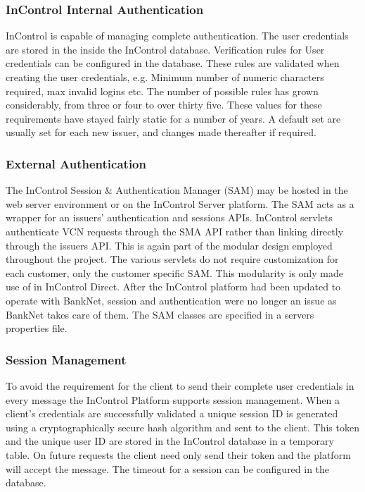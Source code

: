 \documentclass[a4paper, 11pt, titlepage]{article}
\begin{document}
\subsubsection{InControl Internal Authentication} 
InControl is capable of managing complete authentication. The user credentials are stored in the inside the InControl database.
Verification rules for User credentials can be configured in the database. These rules are validated when creating the user credentials, e.g. Minimum number of numeric characters required, max invalid logins etc. The number of possible rules has grown considerably, from three or four to over thirty five. These values for these requirements have stayed fairly static for a number of years. A default set are usually set for each new issuer, and changes made thereafter if required.  
 
\subsubsection{External Authentication} 
The InControl Session \& Authentication Manager (SAM) may be hosted in the web server environment or on the InControl Server platform. The SAM acts as a wrapper for an issuers' authentication and sessions APIs. InControl servlets authenticate VCN requests through the SMA API rather than linking directly through the issuers API. This is again part of the modular design employed throughout the project. The various servlets do not require customization for each customer, only the customer specific SAM. This modularity is only made use of in InControl Direct. After the InControl platform had been updated to operate with BankNet, session and authentication were no longer an issue as BankNet takes care of them. 
The SAM classes are specified in a servers properties file. 
 
\subsubsection{Session Management} 
To avoid the requirement for the client to send their complete user credentials in every message the InControl Platform supports session management. When a client’s credentials are successfully validated a unique session ID is generated using a cryptographically secure hash algorithm and sent to the client. This token and the unique user ID are stored in the InControl database in a temporary table. On future requests the client need only send their token and the platform will accept the message. The timeout for a session can be configured in the database. 
 
\end{document}
